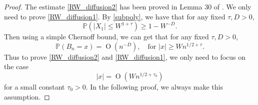 \documentclass{article}
\newcommand{\1}{\mathds{1}}
\numberwithin{equation}{section}
\newcommand{\be}{\begin{equation}}
\newcommand{\ee}{\end{equation}}
\renewcommand{\cal}{\mathcal}
\newcommand{\ii}{\mathrm{i}} %
\renewcommand{\leq}{\leqslant}
\renewcommand{\geq}{\geqslant}
\renewcommand{\le}{\leq}
\renewcommand{\ge}{\geq}
\renewcommand{\P}{\mathbb{P}}
\newcommand{\E}{\mathbb{E}}
\newcommand{\R}{\mathbb{R}}
\newcommand{\Z}{\mathbb{Z}}
\DeclareMathOperator{\OO}{O}
\theoremstyle{plain} %
\theoremstyle{remark}
\begin{document}
\begin{proof} %
The estimate \eqref{RW_diffusion2} has been proved in Lemma 30 of \cite{PartIII}. We only need to prove \eqref{RW_diffusion1}. By \eqref{subpoly}, we have that for any fixed $\tau, D>0$,
$$ \P(|X_1|\le W^{1+\tau})\ge 1- W^{-D}. $$
Then using a simple Chernoff bound, we can get that for any fixed $\tau, D>0$,
\be\label{largeBn} \P\left(B_n = x\right) = \OO(n^{-D}), \quad \text{for \ \ $|x|\ge Wn^{1/2+\tau}$.}\ee
Thus to prove \eqref{RW_diffusion2} and \eqref{RW_diffusion1}, we only need to focus on the case 
\be\label{restrictx} |x|=\OO(W n^{1/2+\tau_0})\ee 
for a small constant $\tau_0>0$. In the following proof, we always make this assumption.
%
% 

\end{proof}
\end{document}
